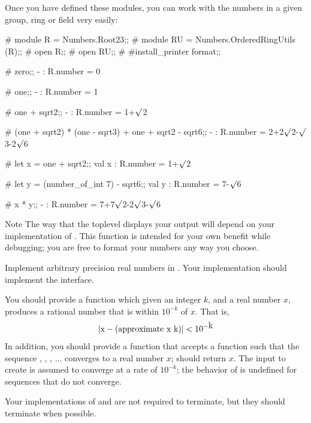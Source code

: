 \documentclass{pset}
\begin{document}
Once you have defined these modules, you can work with the numbers in a given
group, ring or field very easily:
\newcommand{\sq}{\sqrt{\rule{0em}{.5em}}}
\begin{ocaml}
    # module R  = Numbers.Root23;;
    # module RU = Numbers.OrderedRingUtils (R);;
    # open R;;
    # open RU;;
    # #install_printer format;;

    # zero;;
    - : R.number = 0

    # one;;
    - : R.number = 1

    # one + sqrt2;;
    - : R.number = 1+$\sq$2

    # (one + sqrt2) * (one - sqrt3) + one + sqrt2 - sqrt6;;
    - : R.number = 2+2$\sq$2-$\sq$3-2$\sq$6

    # let x = one + sqrt2;;
    val x : R.number = 1+$\sq$2

    # let y = (number_of_int 7) - sqrt6;;
    val y : R.number = 7-$\sq$6

    # x * y;;
    - : R.number = 7+7$\sq$2-2$\sq$3-$\sq$6
\end{ocaml}

\begin{note}{Note}
The way that the toplevel displays your output will depend on your
implementation of .  This function is intended for your own
benefit while debugging; you are free to format your numbers any way you
choose.
\end{note}

Implement arbitrary precision real numbers in
.  Your implementation should implement the
 interface.

You should provide a function  which given an integer $k$,
and a real number $x$, produces a rational number that is within $10^{-k}$ of
$x$.  That is,
\begin{displaymath}
\left|\code{x} - (\code{approximate x k})\right| < 10^{-\code{k}}
\end{displaymath}
In addition, you should provide a function  that accepts a
function  such that the sequence , , ,
$\dots$
converges to a real number $x$;  should
return $x$.  The input to create is assumed to converge at a rate of $10^{-k}$;
the behavior of  is undefined for sequences that do not converge.

Your implementations of \code{(===)} and  are not required to
terminate, but they should terminate when possible.
\end{document}
